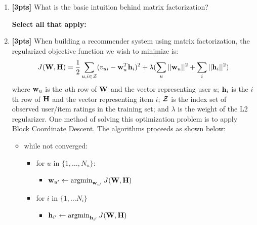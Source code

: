 \begin{enumerate}
 \item \textbf{[3pts]} What is the basic intuition behind matrix factorization?
    
    \textbf{Select all that apply:}
    
    
    
    \clearpage
    
     \item \textbf{[3pts]} When building a recommender system using matrix factorization, the regularized objective function we wish to minimize is:
     $$J(\mathbf{W}, \mathbf{H}) = \frac{1}{2} \sum_{u,i \in \mathcal{Z}}(v_{ui}-\mathbf{w}_u^T \mathbf{h}_i)^2+\lambda(\sum_u ||\mathbf{w}_u||^2+\sum_i ||\mathbf{h}_i||^2)$$
     where $\mathbf{w}_u$ is the $u$th row of $\mathbf{W}$ and the vector representing user $u$; $\mathbf{h}_i$ is the $i$th row of $\mathbf{H}$ and the vector representing item $i$; $\mathcal{Z}$ is the index set of observed user/item ratings in the training set; and $\lambda$ is the weight of the L2 regularizer. One method of solving this optimization problem is to apply Block Coordinate Descent. The algorithms proceeds as shown below:
     
     \begin{itemize}
         \item while not converged:
         \begin{itemize}
            \item for $u$ in $\{1, \ldots, N_u\}$:
            \begin{itemize}
                \item $\mathbf{w}_{u'} \leftarrow \mathop{\mathrm{argmin}}_{\mathbf{w}_{u'}} J(\mathbf{W}, \mathbf{H})$
            \end{itemize}
            \item for $i$ in $\{1, \ldots N_i\}$
             \begin{itemize}
                \item $\mathbf{h}_{i'} \leftarrow \mathop{\mathrm{argmin}}_{\mathbf{h}_{i'}} J(\mathbf{W}, \mathbf{H})$
            \end{itemize}
         \end{itemize}
     \end{itemize}
     

\end{enumerate}
